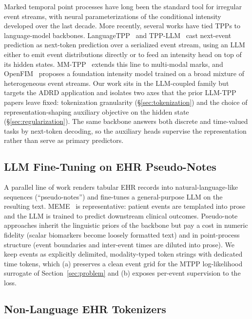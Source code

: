 \documentclass{article}
\begin{document}
Marked temporal point processes have long been the standard tool for irregular event streams, with neural parameterizations of the conditional intensity developed over the last decade.
More recently, several works have tied TPPs to language-model backbones.
LanguageTPP~\citep{kong2025language} and TPP-LLM~\citep{liu2025tpp} cast next-event prediction as next-token prediction over a serialized event stream, using an LLM either to emit event distributions directly or to feed an intensity head on top of its hidden states.
MM-TPP~\citep{li2026longrange} extends this line to multi-modal marks, and OpenFIM~\citep{berghaus2026incontext} proposes a foundation intensity model trained on a broad mixture of heterogeneous event streams.
Our work sits in the LLM-coupled family but targets the ADRD application and isolates two axes that the prior LLM-TPP papers leave fixed: tokenization granularity (§\ref{sec:tokenization}) and the choice of representation-shaping auxiliary objective on the hidden state (§\ref{sec:regularization}). The same backbone answers both discrete and time-valued tasks by next-token decoding, so the auxiliary heads supervise the representation rather than serve as primary predictors.

\subsection{LLM Fine-Tuning on EHR Pseudo-Notes}

A parallel line of work renders tabular EHR records into natural-language-like sequences (``pseudo-notes'') and fine-tunes a general-purpose LLM on the resulting text.
MEME~\citep{lee2025clinical} is representative: patient events are templated into prose and the LLM is trained to predict downstream clinical outcomes.
Pseudo-note approaches inherit the linguistic priors of the backbone but pay a cost in numeric fidelity (scalar biomarkers become loosely formatted text) and in point-process structure (event boundaries and inter-event times are diluted into prose).
We keep events as explicitly delimited, modality-typed token strings with dedicated time tokens, which (a) preserves a clean event grid for the MTPP log-likelihood surrogate of Section~\ref{sec:problem} and (b) exposes per-event supervision to the loss.

\subsection{Non-Language EHR Tokenizers}
\end{document}
